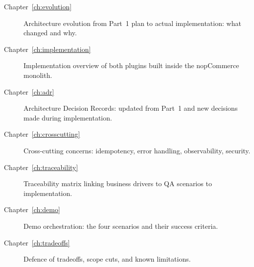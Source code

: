 \begin{description}
    \item[Chapter~\ref{ch:evolution}] Architecture evolution from Part~1 plan to actual implementation: what changed and why.
    \item[Chapter~\ref{ch:implementation}] Implementation overview of both plugins built inside the nopCommerce monolith.
    \item[Chapter~\ref{ch:adr}] Architecture Decision Records: updated from Part~1 and new decisions made during implementation.
    \item[Chapter~\ref{ch:crosscutting}] Cross-cutting concerns: idempotency, error handling, observability, security.
    \item[Chapter~\ref{ch:traceability}] Traceability matrix linking business drivers to QA scenarios to implementation.
    \item[Chapter~\ref{ch:demo}] Demo orchestration: the four scenarios and their success criteria.
    \item[Chapter~\ref{ch:tradeoffs}] Defence of tradeoffs, scope cuts, and known limitations.
\end{description}
